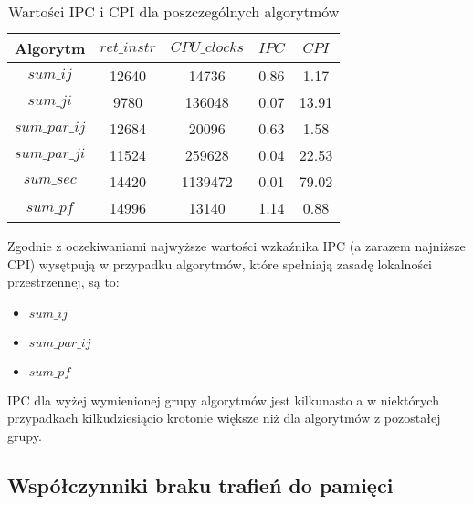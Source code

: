 \begin{table}[!ht]
\caption{Wartości IPC i CPI dla poszczególnych algorytmów}
\begin{tabular}{|c|c|c|c|c|}

\hline
  Algorytm &
  $ret\_instr$ &
  $CPU\_clocks$ &
  $IPC$ &
  $CPI$ \\

\hline
  $sum\_ij$ &
  12640 &
  14736 &
  0.86 &
  1.17 \\

\hline
  $sum\_ji$ &
  9780 &
  136048 &
  0.07 &
  13.91 \\

\hline
  $sum\_par\_ij$ &
  12684 &
  20096 &
  0.63 &
  1.58 \\

\hline
  $sum\_par\_ji$ &
  11524 &
  259628 &
  0.04 &
  22.53 \\

\hline
  $sum\_sec$ &
  14420 &
  1139472 &
  0.01 &
  79.02 \\

\hline
  $sum\_pf$ &
  14996 &
  13140 &
  1.14 &
  0.88 \\

\hline

\end{tabular}
\end{table}

Zgodnie z oczekiwaniami najwyższe wartości wzkaźnika IPC (a zarazem najniższe CPI) wysętpują w przypadku algorytmów, które spełniają zasadę lokalności przestrzennej, są to:
\begin{itemize}
\item $sum\_ij$
\item $sum\_par\_ij$
\item $sum\_pf$
\end{itemize}

IPC dla wyżej wymienionej grupy algorytmów jest kilkunasto a w niektórych przypadkach kilkudziesiącio krotonie większe niż dla algorytmów z pozostałej grupy.

\subsection{Współczynniki braku trafień do pamięci}
\label{sec:trafienia}


